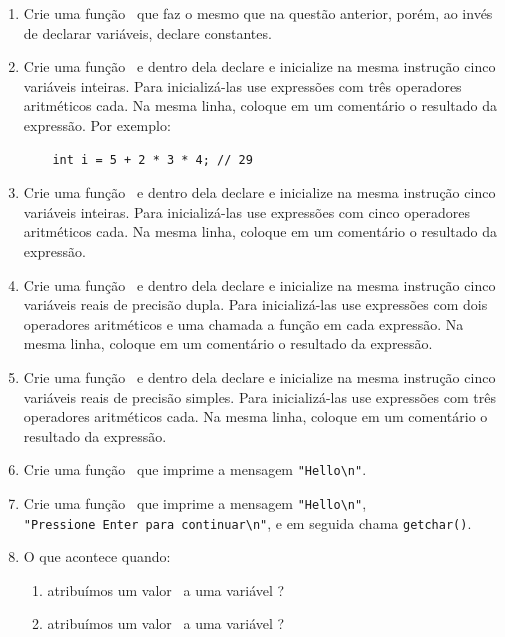 \begin{enumerate}
  \item Crie uma função \MAIN\ que faz o mesmo que na questão anterior, porém, ao invés de declarar variáveis, declare constantes.

  \item Crie uma função \MAIN\ e dentro dela declare e inicialize na mesma instrução cinco variáveis inteiras. Para inicializá-las use expressões com três operadores aritméticos cada. Na mesma linha, coloque em um comentário o resultado da expressão. Por exemplo:
\begin{lstlisting}
	int i = 5 + 2 * 3 * 4; // 29
\end{lstlisting}

  \item Crie uma função \MAIN\ e dentro dela declare e inicialize na mesma instrução cinco variáveis inteiras. Para inicializá-las use expressões com cinco operadores aritméticos cada. Na mesma linha, coloque em um comentário o resultado da expressão.

  \item Crie uma função \MAIN\ e dentro dela declare e inicialize na mesma instrução cinco variáveis reais de precisão dupla. Para inicializá-las use expressões com dois operadores aritméticos e uma chamada a função em cada expressão. Na mesma linha, coloque em um comentário o resultado da expressão.

  \item Crie uma função \MAIN\ e dentro dela declare e inicialize na mesma instrução cinco variáveis reais de precisão simples. Para inicializá-las use expressões com três operadores aritméticos cada. Na mesma linha, coloque em um comentário o resultado da expressão.

  \item Crie uma função \MAIN\ que imprime a mensagem \verb|"Hello\n"|.

  \item Crie uma função \MAIN\ que imprime a mensagem \verb|"Hello\n"|, \\\verb|"Pressione Enter para continuar\n"|, e em seguida chama \verb|getchar()|.

  \item O que acontece quando:
    \begin{enumerate}
      \item atribuímos um valor \INT\ a uma variável \FLOAT?
      \item atribuímos um valor \FLOAT\ a uma variável \INT?
    \end{enumerate}


\end{enumerate}
